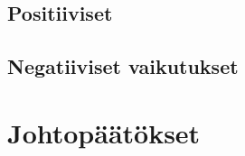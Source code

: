 \documentclass[utf8,bachelor,finnish]{bachelor}
\begin{document}
  \section{Positiiviset}
  \section{Negatiiviset vaikutukset}
  
  \chapter{Johtopäätökset}




\printbibliography
\end{document}
